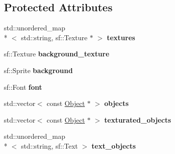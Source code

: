 \subsection*{Protected Attributes}
\begin{DoxyCompactItemize}
\item 
\hypertarget{classState_a9fe3983efbf800d94bde79b304fa0769}{std\+::unordered\+\_\+map\\*
$<$ std\+::string, sf\+::\+Texture $\ast$ $>$ {\bfseries textures}}\label{classState_a9fe3983efbf800d94bde79b304fa0769}

\item 
\hypertarget{classState_a4982a5b77746daf5e042359b45cb9a3a}{sf\+::\+Texture {\bfseries background\+\_\+texture}}\label{classState_a4982a5b77746daf5e042359b45cb9a3a}

\item 
\hypertarget{classState_addd1389225a80440a320adbb386cfe12}{sf\+::\+Sprite {\bfseries background}}\label{classState_addd1389225a80440a320adbb386cfe12}

\item 
\hypertarget{classState_ac01e57d52a3bf0d9b24c02daecd79e30}{sf\+::\+Font {\bfseries font}}\label{classState_ac01e57d52a3bf0d9b24c02daecd79e30}

\item 
\hypertarget{classState_a9f93fadc63056740b57f2b8655327fcd}{std\+::vector$<$ const \hyperlink{classObject}{Object} $\ast$ $>$ {\bfseries objects}}\label{classState_a9f93fadc63056740b57f2b8655327fcd}

\item 
\hypertarget{classState_a8f0f08cc8fcc900e4864f42d53a4d6b5}{std\+::vector$<$ const \hyperlink{classObject}{Object} $\ast$ $>$ {\bfseries texturated\+\_\+objects}}\label{classState_a8f0f08cc8fcc900e4864f42d53a4d6b5}

\item 
\hypertarget{classState_affee9f7ca66bb6a54f882b297939abbb}{std\+::unordered\+\_\+map\\*
$<$ std\+::string, sf\+::\+Text $>$ {\bfseries text\+\_\+objects}}\label{classState_affee9f7ca66bb6a54f882b297939abbb}

\end{DoxyCompactItemize}


